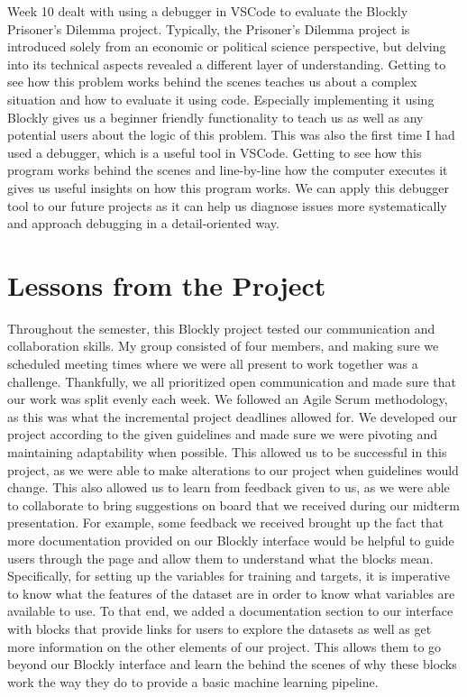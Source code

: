 \documentclass{article}
\theoremstyle{theorem}
\theoremstyle{definition}
\theoremstyle{remark}
\begin{document}
Week 10 dealt with using a debugger in VSCode to evaluate the Blockly Prisoner's Dilemma project. Typically, the Prisoner's Dilemma project is introduced solely from an economic or political science perspective, but delving into its technical aspects revealed a different layer of understanding. Getting to see how this problem works behind the scenes teaches us about a complex situation and how to evaluate it using code. Especially implementing it using Blockly gives us a beginner friendly functionality to teach us as well as any potential users about the logic of this problem. This was also the first time I had used a debugger, which is a useful tool in VSCode. Getting to see how this program works behind the scenes and line-by-line how the computer executes it gives us useful insights on how this program works. We can apply this debugger tool to our future projects as it can help us diagnose issues more systematically and approach debugging in a detail-oriented way.

\section{Lessons from the Project}

Throughout the semester, this Blockly project tested our communication and collaboration skills. My group consisted of four members, and making sure we scheduled meeting times where we were all present to work together was a challenge. Thankfully, we all prioritized open communication and made sure that our work was split evenly each week. We followed an Agile Scrum methodology, as this was what the incremental project deadlines allowed for. We developed our project according to the given guidelines and made sure we were pivoting and maintaining adaptability when possible. This allowed us to be successful in this project, as we were able to make alterations to our project when guidelines would change. This also allowed us to learn from feedback given to us, as we were able to collaborate to bring suggestions on board that we received during our midterm presentation. For example, some feedback we received brought up the fact that more documentation provided on our Blockly interface would be helpful to guide users through the page and allow them to understand what the blocks mean. Specifically, for setting up the variables for training and targets, it is imperative to know what the features of the dataset are in order to know what variables are available to use. To that end, we added a documentation section to our interface with blocks that provide links for users to explore the datasets as well as get more information on the other elements of our project. This allows them to go beyond our Blockly interface and learn the behind the scenes of why these blocks work the way they do to provide a basic machine learning pipeline. 
\end{document}
